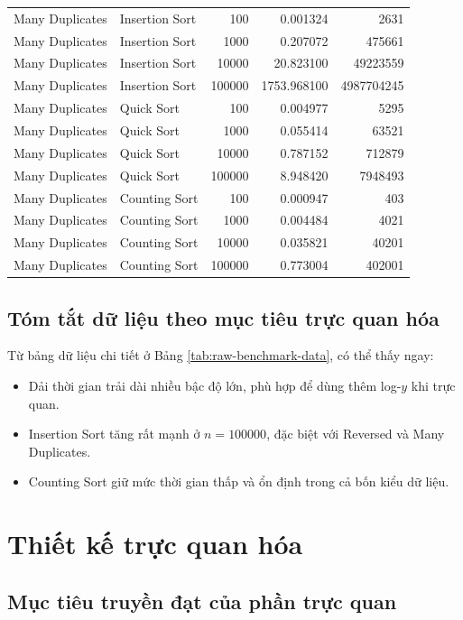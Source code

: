 \begin{center}
\begin{longtable}{llrrr}
Many Duplicates & Insertion Sort & 100 & 0.001324 & 2631 \\
Many Duplicates & Insertion Sort & 1000 & 0.207072 & 475661 \\
Many Duplicates & Insertion Sort & 10000 & 20.823100 & 49223559 \\
Many Duplicates & Insertion Sort & 100000 & 1753.968100 & 4987704245 \\
Many Duplicates & Quick Sort & 100 & 0.004977 & 5295 \\
Many Duplicates & Quick Sort & 1000 & 0.055414 & 63521 \\
Many Duplicates & Quick Sort & 10000 & 0.787152 & 712879 \\
Many Duplicates & Quick Sort & 100000 & 8.948420 & 7948493 \\
Many Duplicates & Counting Sort & 100 & 0.000947 & 403 \\
Many Duplicates & Counting Sort & 1000 & 0.004484 & 4021 \\
Many Duplicates & Counting Sort & 10000 & 0.035821 & 40201 \\
Many Duplicates & Counting Sort & 100000 & 0.773004 & 402001 \\

\end{longtable}
\end{center}

\subsection{Tóm tắt dữ liệu theo mục tiêu trực quan hóa}

Từ bảng dữ liệu chi tiết ở Bảng \ref{tab:raw-benchmark-data}, có thể thấy ngay:
\begin{itemize}[leftmargin=1.2cm]
    \item Dải thời gian trải dài nhiều bậc độ lớn, phù hợp để dùng thêm log-$y$ khi trực quan.
    \item Insertion Sort tăng rất mạnh ở $n=100000$, đặc biệt với Reversed và Many Duplicates.
    \item Counting Sort giữ mức thời gian thấp và ổn định trong cả bốn kiểu dữ liệu.
\end{itemize}

\section{Thiết kế trực quan hóa}

\subsection{Mục tiêu truyền đạt của phần trực quan}

